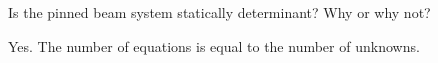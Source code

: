 Is the pinned beam system statically determinant? Why or why not?

\begin{solution}
    Yes. The number of equations is equal to the number of unknowns.
\end{solution}